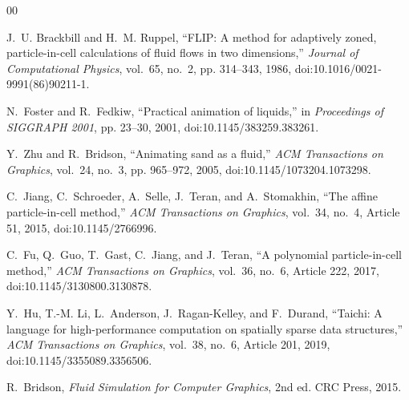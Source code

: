 \documentclass[conference]{IEEEtran}
\begin{document}
\begin{thebibliography}{00}

J.~U. Brackbill and H.~M. Ruppel, ``FLIP: A method for adaptively zoned, particle-in-cell calculations of fluid flows in two dimensions,'' \emph{Journal of Computational Physics}, vol.~65, no.~2, pp. 314--343, 1986, doi:10.1016/0021-9991(86)90211-1.

N.~Foster and R.~Fedkiw, ``Practical animation of liquids,'' in \emph{Proceedings of SIGGRAPH 2001}, pp. 23--30, 2001, doi:10.1145/383259.383261.

Y.~Zhu and R.~Bridson, ``Animating sand as a fluid,'' \emph{ACM Transactions on Graphics}, vol.~24, no.~3, pp. 965--972, 2005, doi:10.1145/1073204.1073298.

C.~Jiang, C.~Schroeder, A.~Selle, J.~Teran, and A.~Stomakhin, ``The affine particle-in-cell method,'' \emph{ACM Transactions on Graphics}, vol.~34, no.~4, Article 51, 2015, doi:10.1145/2766996.

C.~Fu, Q.~Guo, T.~Gast, C.~Jiang, and J.~Teran, ``A polynomial particle-in-cell method,'' \emph{ACM Transactions on Graphics}, vol.~36, no.~6, Article 222, 2017, doi:10.1145/3130800.3130878.

Y.~Hu, T.-M. Li, L.~Anderson, J.~Ragan-Kelley, and F.~Durand, ``Taichi: A language for high-performance computation on spatially sparse data structures,'' \emph{ACM Transactions on Graphics}, vol.~38, no.~6, Article 201, 2019, doi:10.1145/3355089.3356506.

R.~Bridson, \emph{Fluid Simulation for Computer Graphics}, 2nd ed. CRC Press, 2015.

\end{thebibliography}
\end{document}
